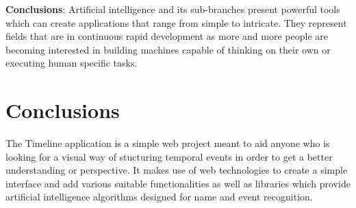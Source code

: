 \documentclass{report}
\begin{document}
\textbf{Conclusions}: Artificial intelligence and its sub-branches present powerful tools which can create applications that range from simple to intricate. They represent fields that are in continuous rapid development as more and more people are becoming interested in building machines capable of thinking on their own or executing human specific tasks.
\newpage

\chapter{Conclusions}
The Timeline application is a simple web project meant to aid anyone who is looking for a visual way of stucturing temporal events in order to get a better understanding or perspective. It makes use of web technologies to create a simple interface and add various suitable functionalities as well as libraries which provide artificial intelligence algorithms designed for name and event recognition.

\newpage
\end{document}

